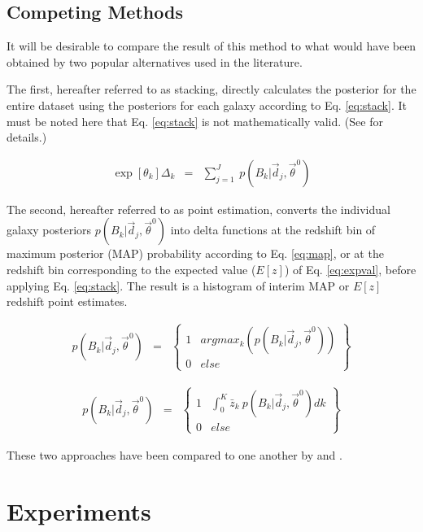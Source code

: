 \documentclass[preprint]{aastex}
\begin{document}
\clearpage
\subsection{Competing Methods}
\label{sec:sheldon}

It will be desirable to compare the result of this method to what would have 
been obtained by two popular alternatives used in the literature.   

The first, hereafter referred to as stacking, directly calculates the posterior 
for the entire dataset using the posteriors for each galaxy according to Eq. 
\ref{eq:stack}.  \citep{lim08}  It must be noted here that Eq. \ref{eq:stack} 
is not mathematically valid.  (See \citet{hog12} for details.)  

\begin{eqnarray}
\label{eq:stack}
\exp[\theta_{k}]\Delta_{k} &=& \sum_{j=1}^{J}\ 
p(B_{k}|\vec{d}_{j},\vec{\theta}^{0})
\end{eqnarray}

The second, hereafter referred to as point estimation, converts the individual 
galaxy posteriors $p(B_{k}|\vec{d}_{j},\vec{\theta}^{0})$ into delta functions 
at the redshift bin of maximum posterior (MAP) probability according to Eq. 
\ref{eq:map}, or at the redshift bin corresponding to the expected value 
($E[z]$) of Eq. \ref{eq:expval}, before applying Eq. \ref{eq:stack}.  The 
result is a histogram of interim MAP or $E[z]$ redshift point estimates.

\begin{eqnarray}
\label{eq:map}
p(B_{k}|\vec{d}_{j},\vec{\theta}^{0}) &=& 
\left\{\begin{array}{cc}1&argmax_{k}(p(B_{k}|\vec{d}_{j},\vec{\theta}^{0}))\\0&e
lse\end{array}\right\}
\end{eqnarray}

\begin{eqnarray}
\label{eq:expval}
p(B_{k}|\vec{d}_{j},\vec{\theta}^{0}) &=& 
\left\{\begin{array}{cc}1&\int_{0}^{K} \bar{z}_{k}\ 
p(B_{k}|\vec{d}_{j},\vec{\theta}^{0}) dk\\0&else\end{array}\right\}
\end{eqnarray}

These two approaches have been compared to one another by \citet{hil11} and 
\citet{ben12}.

\clearpage
\section{Experiments}
\label{sec:exp}
\end{document}
